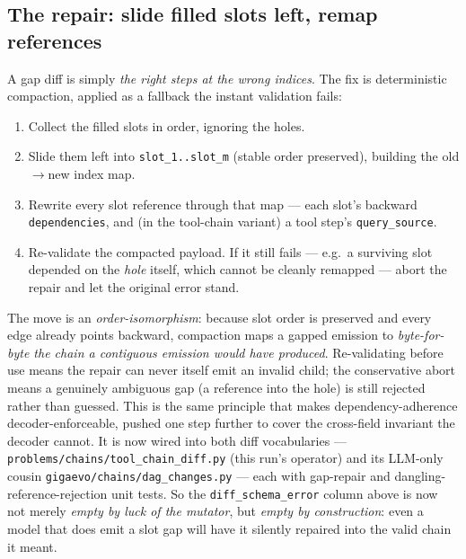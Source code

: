 \documentclass[11pt]{article}
\begin{document}
\subsection{The repair: slide filled slots left, remap references}
A gap diff is simply \emph{the right steps at the wrong indices}. The fix is deterministic
compaction, applied as a fallback the instant validation fails:
\begin{enumerate}
  \item Collect the filled slots in order, ignoring the holes.
  \item Slide them left into \texttt{slot\_1..slot\_m} (stable order preserved), building the
  old$\to$new index map.
  \item Rewrite every slot reference through that map --- each slot's backward
  \texttt{dependencies}, and (in the tool-chain variant) a tool step's \texttt{query\_source}.
  \item Re-validate the compacted payload. If it still fails --- e.g.\ a surviving slot depended on
  the \emph{hole} itself, which cannot be cleanly remapped --- abort the repair and let the original
  error stand.
\end{enumerate}
The move is an \emph{order-isomorphism}: because slot order is preserved and every edge already
points backward, compaction maps a gapped emission to \emph{byte-for-byte the chain a contiguous
emission would have produced}. Re-validating before use means the repair can never itself emit an
invalid child; the conservative abort means a genuinely ambiguous gap (a reference into the hole)
is still rejected rather than guessed. This is the same principle that makes dependency-adherence
decoder-enforceable, pushed one step further to cover the cross-field invariant the decoder cannot.
It is now wired into both diff vocabularies --- \texttt{problems/chains/tool\_chain\_diff.py}
(this run's operator) and its LLM-only cousin \texttt{gigaevo/chains/dag\_changes.py} --- each with
gap-repair and dangling-reference-rejection unit tests. So the \texttt{diff\_schema\_error} column
above is now not merely \emph{empty by luck of the mutator}, but \emph{empty by construction}: even
a model that does emit a slot gap will have it silently repaired into the valid chain it meant.
\end{document}
